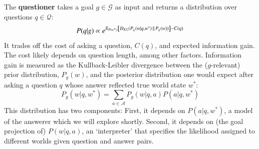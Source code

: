 \documentclass[12pt, floatsintext, jou]{apa6}
\begin{document}
The \textbf{questioner} takes a goal $g \in \mathcal{G}$ as input and returns a distribution over questions $q \in \mathcal{Q}$:
%
$$ 
P(q|g) \propto e^{\mathbb{E}_{P(w^*)}\left [D_{KL}({P_g(w|q, w^*)}\, \| \, {P_g(w)}) \right] - C(q)} 
$$
%
It trades off the cost of asking a question, $C(q)$, and expected information gain. The cost likely depends on question length, among other factors. Information gain is measured as the Kullback-Leibler divergence between the ($g$-relevant) prior distribution, $P_g(w)$, and the posterior distribution one would expect after asking a question $q$ whose answer reflected true world state $w^*$:
%
$$ P_g(w|q, w^*) = \sum_{a \in \mathcal{A}} P_g(w |q, a) P(a| q, w^*)$$
%
This distribution has two components: 
First, it depends on $P(a | q, w^*)$, a model of the answerer which we will explore shortly.
Second, it depends on (the goal projection of) 
$P(w | q, a)$, an `interpreter' that specifies the likelihood assigned to different worlds given question and answer pairs.
\end{document}
